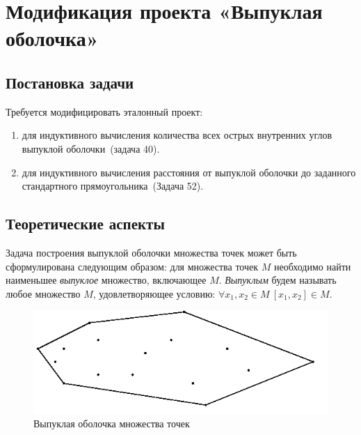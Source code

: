 \section{Модификация проекта «Выпуклая оболочка»}

\subsection{Постановка задачи}
Требуется модифицировать эталонный проект:
\begin{enumerate}
\item для индуктивного вычисления количества всех острых внутренних углов выпуклой
оболочки~(задача 40).
\item для индуктивного вычисления расстояния от выпуклой оболочки до заданного
стандартного прямоугольника~(Задача 52).
\end{enumerate}
\subsection{Теоретические аспекты}

Задача построения выпуклой оболочки множества точек может быть сформулирована следующим
образом: для множества точек $M$ необходимо найти наименьшее \emph{выпуклое} множество,
включающее $M$. \emph{Выпуклым} будем называть любое множество $M$, удовлетворяющее условию:
$ \forall x_1, x_2 \in M\ [x_1,x_2]\in M.$

\begin{figure}[ht!]
\begin{center}
\includegraphics[scale=0.6]{images/conv_a_1}
\end{center}
\vspace*{-8mm}
\caption{Выпуклая оболочка множества точек}\label{fig:convex_hull}
\end{figure}

